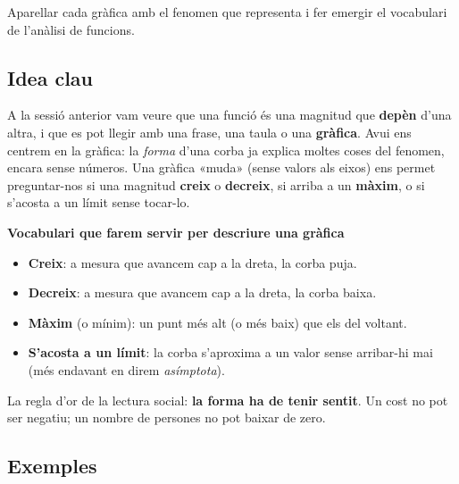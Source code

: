 %
{Aparellar cada gràfica amb el fenomen que representa i fer emergir el vocabulari de l'anàlisi de funcions.}

\subsection{Idea clau}

A la sessió anterior vam veure que una funció és una magnitud que \textbf{depèn}
d'una altra, i que es pot llegir amb una frase, una taula o una \textbf{gràfica}.
Avui ens centrem en la gràfica: la \emph{forma} d'una corba ja explica moltes coses
del fenomen, encara sense números. Una gràfica «muda» (sense valors als eixos) ens
permet preguntar-nos si una magnitud \textbf{creix} o \textbf{decreix}, si arriba a
un \textbf{màxim}, o si s'acosta a un límit sense tocar-lo.

\begin{idea}
\textbf{Vocabulari que farem servir per descriure una gràfica}
\begin{itemize}[leftmargin=1.4em, itemsep=2pt]
  \item \textbf{Creix}: a mesura que avancem cap a la dreta, la corba puja.
  \item \textbf{Decreix}: a mesura que avancem cap a la dreta, la corba baixa.
  \item \textbf{Màxim} (o mínim): un punt més alt (o més baix) que els del voltant.
  \item \textbf{S'acosta a un límit}: la corba s'aproxima a un valor sense arribar-hi
        mai (més endavant en direm \emph{asímptota}).
\end{itemize}
La regla d'or de la lectura social: \textbf{la forma ha de tenir sentit}. Un cost no
pot ser negatiu; un nombre de persones no pot baixar de zero.
\end{idea}

\subsection{Exemples}

